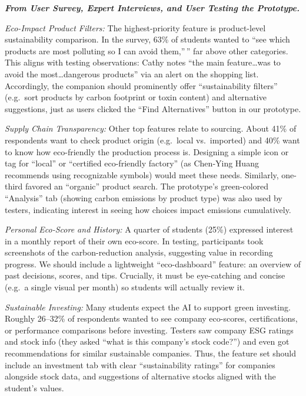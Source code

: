 \documentclass[
  12pt,
  letterpaper,
  DIV=11,
  numbers=noendperiod]{scrartcl}
\begin{document}
\textbf{\emph{From User Survey, Expert Interviews, and User Testing the
Prototype.}}

\emph{Eco-Impact Product Filters:} The highest-priority feature is
product-level sustainability comparison. In the survey, 63\% of students
wanted to ``see which products are most polluting so I can avoid
them,''\,'' far above other categories. This aligns with testing
observations: Cathy notes ``the main feature\ldots was to avoid the
most\ldots dangerous products'' via an alert on the shopping list.
Accordingly, the companion should prominently offer ``sustainability
filters'' (e.g.~sort products by carbon footprint or toxin content) and
alternative suggestions, just as users clicked the ``Find Alternatives''
button in our prototype.

\emph{Supply Chain Transparency:} Other top features relate to sourcing.
About 41\% of respondents want to check product origin (e.g.~local
vs.~imported) and 40\% want to know how eco-friendly the production
process is. Designing a simple icon or tag for ``local'' or ``certified
eco-friendly factory'' (as Chen‑Ying Huang recommends using recognizable
symbols) would meet these needs. Similarly, one-third favored an
``organic'' product search. The prototype's green-colored ``Analysis''
tab (showing carbon emissions by product type) was also used by testers,
indicating interest in seeing how choices impact emissions cumulatively.

\emph{Personal Eco-Score and History:} A quarter of students (25\%)
expressed interest in a monthly report of their own eco-score. In
testing, participants took screenshots of the carbon-reduction analysis,
suggesting value in recording progress. We should include a lightweight
``eco-dashboard'' feature: an overview of past decisions, scores, and
tips. Crucially, it must be eye-catching and concise (e.g.~a single
visual per month) so students will actually review it.

\emph{Sustainable Investing:} Many students expect the AI to support
green investing. Roughly 26--32\% of respondents wanted to see company
eco-scores, certifications, or performance comparisons before investing.
Testers saw company ESG ratings and stock info (they asked ``what is
this company's stock code?'') and even got recommendations for similar
sustainable companies. Thus, the feature set should include an
investment tab with clear ``sustainability ratings'' for companies
alongside stock data, and suggestions of alternative stocks aligned with
the student's values.
\end{document}
